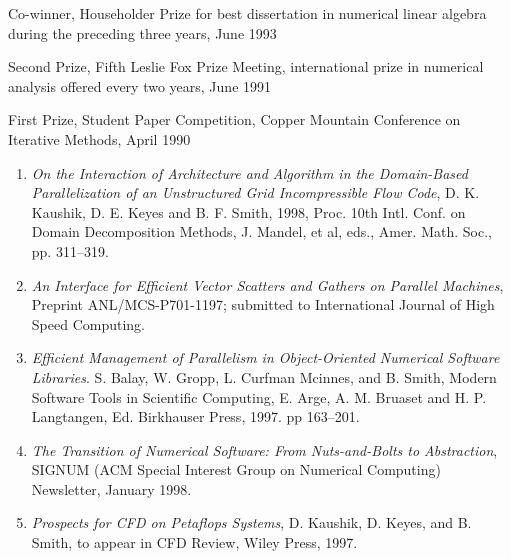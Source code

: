 \itemskip
{}
\begin{description}
\item
Co-winner, Householder Prize for best dissertation 
          in numerical linear algebra during the preceding
          three years, June 1993
\item
Second Prize, Fifth Leslie Fox Prize Meeting,  international
          prize in numerical analysis offered every two years, June 1991
\item
First Prize, Student Paper Competition, Copper Mountain
           Conference on Iterative  Methods, April 1990
\end{description}
 

\itemskip
{}
\begin{enumerate}
\item
{\em On the Interaction of Architecture and Algorithm in the Domain-Based
Parallelization of an Unstructured Grid Incompressible Flow Code},
D. K. Kaushik, D. E. Keyes and B. F. Smith, 
1998,
Proc. 10th Intl. Conf. on Domain Decomposition
Methods, 
J. Mandel, et al, eds., 
Amer. Math. Soc., 
pp. 311--319. 
\item
{\em An Interface for Efficient Vector Scatters and Gathers
              on Parallel Machines}, Preprint ANL/MCS-P701-1197;
              submitted to International Journal of High Speed Computing.
\item 
{\em Efficient 
              Management of Parallelism in Object-Oriented Numerical 
              Software Libraries}. S. Balay, W. Gropp, L. Curfman Mcinnes, and B. Smith,
              Modern Software Tools in Scientific 
              Computing, E. Arge, A. M. Bruaset and H. P. Langtangen, Ed. 
              Birkhauser Press, 1997. pp 163--201.
\item 
{\em The Transition of Numerical Software: From Nuts-and-Bolts 
             to Abstraction}, SIGNUM (ACM Special Interest Group on Numerical 
             Computing) Newsletter, January 1998.
\item 
{\em Prospects for 
              CFD on Petaflops Systems}, D. Kaushik, D. Keyes, and B. Smith,
              to appear in CFD Review, Wiley Press, 1997.
\end{enumerate}

\newpage

